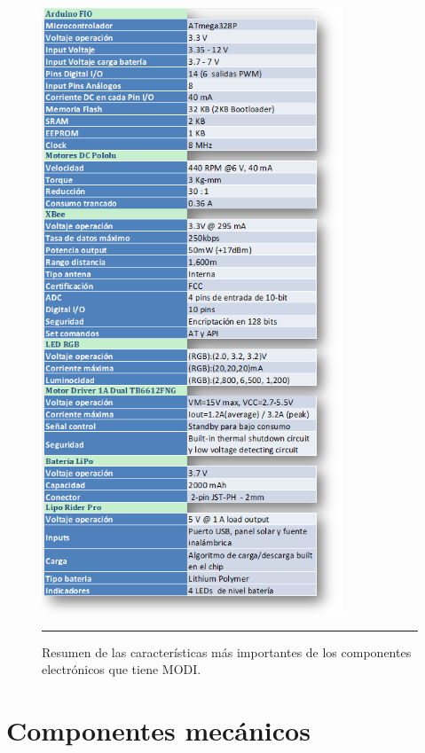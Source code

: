 \begin{figure}[htbp]
	\centering
		\includegraphics[width=0.8\textwidth]{./Figures/MODI/comparacionElo.png}
		\rule{35em}{0.5pt}
	\caption[Tabla caracteristicas mas importantes de los componentes Eléctronicos]{Resumen de las características más importantes de los componentes electrónicos que tiene MODI.}
	\label{fig:TablaElo}
\end{figure}


\section{Componentes mecánicos}

